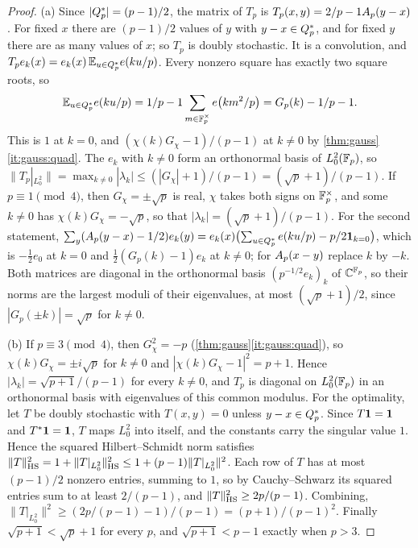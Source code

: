 \begin{proof}
(a) Since $|Q_{p}^{*}|=(p-1)/2$, the matrix of $T_p$ is
$T_p(x,y)=2/p-1A_{p}(y-x)$. For fixed $x$ there are $(p-1)/2$ values of $y$
with $y-x\in Q_{p}^{*}$, and for fixed $y$ there are as many values of $x$; so $T_p$
is doubly stochastic. It is a convolution, and
$T_pe_k(x)=e_k(x)\,\mathbb E_{u\in Q_{p}^{*}}e\!\left(ku/p\right)$. Every nonzero square has exactly two
square roots, so
\[
 \mathbb E_{u\in Q_{p}^{*}}e\!\left(ku/p\right)=1/p-1\sum_{m\in\mathbb F_p^\times}e\!\left(km^2/p\right)=G_p(k)-1/p-1.
\]
This is $1$ at $k=0$, and $(\chi(k)G_\chi-1)/(p-1)$ at $k\ne0$ by
\cref{thm:gauss}\ref{it:gauss:quad}. The $e_k$ with $k\ne0$ form an orthonormal
basis of $L^2_0(\mathbb F_p)$, so $\|T_p|_{L^2_0}\|=\max_{k\ne0}|\lambda_k|\le
(|G_\chi|+1)/(p-1)=(\sqrt p+1)/(p-1)$. If $p\equiv1\pmod4$, then
$G_\chi=\pm\sqrt p$ is real, $\chi$ takes both signs on $\mathbb F_p^\times$, and some
$k\ne0$ has $\chi(k)G_\chi=-\sqrt p$, so that $|\lambda_k|=(\sqrt p+1)/(p-1)$.
For the second statement,
$\sum_y(A_{p}(y-x)-1/2)e_k(y)=e_k(x)\bigl(\sum_{u\in Q_{p}^{*}}e\!\left(ku/p\right)-p/2\mathbf 1_{k=0}\bigr)$,
which is $-\frac12e_0$ at $k=0$ and $\frac12(G_p(k)-1)e_k$ at $k\ne0$; for
$A_{p}(x-y)$ replace $k$ by $-k$. Both matrices are diagonal in the orthonormal
basis $(p^{-1/2}e_k)_k$ of $\mathbb C^{\mathbb F_p}$, so their norms are the largest moduli of
their eigenvalues, at most $(\sqrt p+1)/2$, since $|G_p(\pm k)|=\sqrt p$ for
$k\ne0$.

(b) If $p\equiv3\pmod4$, then $G_\chi^2=-p$ (\cref{thm:gauss}\ref{it:gauss:quad}),
so $\chi(k)G_\chi=\pm i\sqrt p$ for $k\ne0$ and $|\chi(k)G_\chi-1|^2=p+1$.
Hence $|\lambda_k|=\sqrt{p+1}/(p-1)$ for every $k\ne0$, and $T_p$ is diagonal on
$L^2_0(\mathbb F_p)$ in an orthonormal basis with eigenvalues of this common modulus.
For the optimality, let $T$ be doubly stochastic with $T(x,y)=0$ unless
$y-x\in Q_{p}^{*}$. Since $T\mathbf 1=\mathbf 1$ and $T^*\mathbf 1=\mathbf 1$, $T$ maps $L^2_0$ into
itself, and the constants carry the singular value $1$. Hence the squared
Hilbert--Schmidt norm satisfies
$\|T\|_{\rm HS}^2=1+\|T|_{L^2_0}\|_{\rm HS}^2\le1+(p-1)\|T|_{L^2_0}\|^2$. Each
row of $T$ has at most $(p-1)/2$ nonzero entries, summing to $1$, so by
Cauchy--Schwarz its squared entries sum to at least $2/(p-1)$, and
$\|T\|_{\rm HS}^2\ge2p/(p-1)$. Combining,
$\|T|_{L^2_0}\|^2\ge(2p/(p-1)-1)/(p-1)=(p+1)/(p-1)^2$. Finally
$\sqrt{p+1}<\sqrt p+1$ for every $p$, and $\sqrt{p+1}<p-1$ exactly when $p>3$.


\end{proof}
